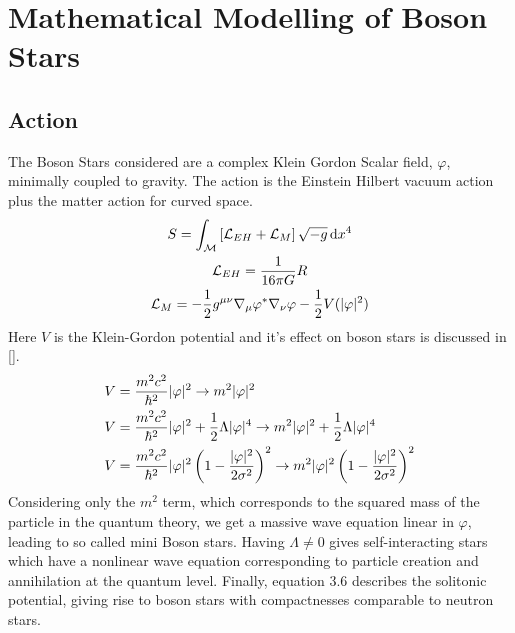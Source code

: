 




\section{Mathematical Modelling of Boson Stars}
\subsection{Action}
The Boson Stars considered are a complex Klein Gordon Scalar field, $\varphi$, minimally coupled to gravity. The action is the Einstein Hilbert vacuum action plus the matter action for curved space.
\begin{gather} S = \int_\mathcal{M}\left[\mathcal{L}_{EH} + \mathcal{L}_M\right] \sqrt{-g}\,\dd x^4 \\
 \mathcal{L}_{EH} = \frac{1}{16\pi G}R \\
 \mathcal{L}_{M} =-\frac{1}{2}g^{\mu\nu}\nabla_\mu \varphi^* \nabla_\nu \varphi - \frac{1}{2}V(|\varphi|^2)  \end{gather}
Here $V$ is the Klein-Gordon potential and it's effect on boson stars is discussed in [].
\begin{align}
V &= \frac{m^2 c^2}{\hbar^2 }|\varphi|^2 \rightarrow m^2 |\varphi|^2\\
V &= \frac{m^2 c^2}{\hbar^2 }|\varphi|^2 + \frac{1}{2}\Lambda|\varphi|^4 \rightarrow m^2|\varphi|^2 + \frac{1}{2}\Lambda|\varphi|^4\\
V &= \frac{m^2 c^2}{\hbar^2 }|\varphi|^2\left(1-\frac{|\varphi|^2}{2\sigma^2}\right)^2 \rightarrow {m^2 }|\varphi|^2\left(1-\frac{|\varphi|^2}{2\sigma^2}\right)^2
\end{align}
Considering only the $m^2$ term, which corresponds to the squared mass of the particle in the quantum theory, we get a massive wave equation linear in $\varphi$, leading to so called mini Boson stars. Having $\Lambda\neq0$ gives self-interacting stars which have a nonlinear wave equation corresponding to particle creation and annihilation at the quantum level. Finally, equation 3.6 describes the solitonic potential, giving rise to boson stars with compactnesses comparable to neutron stars. 

